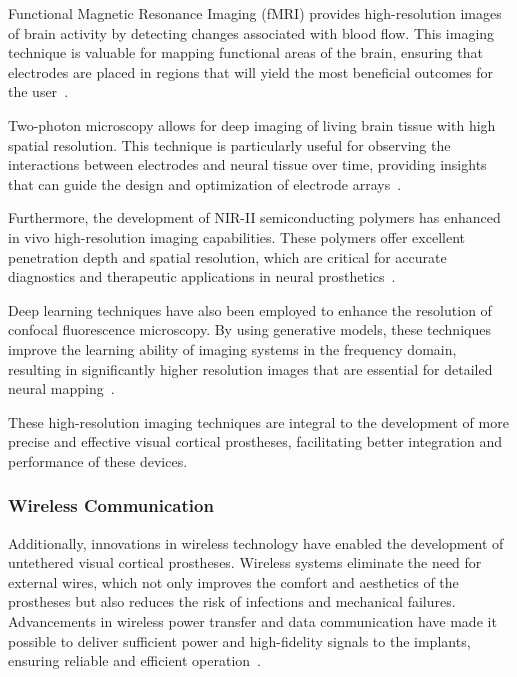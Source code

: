 \documentclass[twocolumn,10pt]{article}
\begin{document}
Functional Magnetic Resonance Imaging (fMRI) provides high-resolution images of
brain activity by detecting changes associated with blood flow. This imaging
technique is valuable for mapping functional areas of the brain, ensuring that
electrodes are placed in regions that will yield the most beneficial outcomes
for the user~\cite{landelleInvestigatingHumanSpinal2021}.

Two-photon microscopy allows for deep imaging of living brain tissue with high
spatial resolution. This technique is particularly useful for observing the
interactions between electrodes and neural tissue over time, providing insights
that can guide the design and optimization of electrode
arrays~\cite{yangIntegratedMicroprismMicroelectrode2024}.

Furthermore, the development of NIR-II semiconducting polymers has enhanced in
vivo high-resolution imaging capabilities. These polymers offer excellent
penetration depth and spatial resolution, which are critical for accurate
diagnostics and therapeutic applications in neural prosthetics~\cite{wangRecentProgressSecond2023,kangNIRIISemiconductingPolymers2023}.

Deep learning techniques have also been employed to enhance the resolution of
confocal fluorescence microscopy. By using generative models, these techniques
improve the learning ability of imaging systems in the frequency domain,
resulting in significantly higher resolution images that are essential for
detailed neural mapping~\cite{huangEnhancingImageResolution2023}.

These high-resolution imaging techniques are integral to the development of more
precise and effective visual cortical prostheses, facilitating better
integration and performance of these devices.

\subsubsection*{Wireless Communication}
Additionally, innovations in wireless technology have enabled the development of
untethered visual cortical prostheses. Wireless systems eliminate the need for
external wires, which not only improves the comfort and aesthetics of the
prostheses but also reduces the risk of infections and mechanical failures.
Advancements in wireless power transfer and data communication have made it
possible to deliver sufficient power and high-fidelity signals to the implants,
ensuring reliable and efficient
operation~\cite{rosenfeldTissueResponseChronically2020}.
\end{document}
